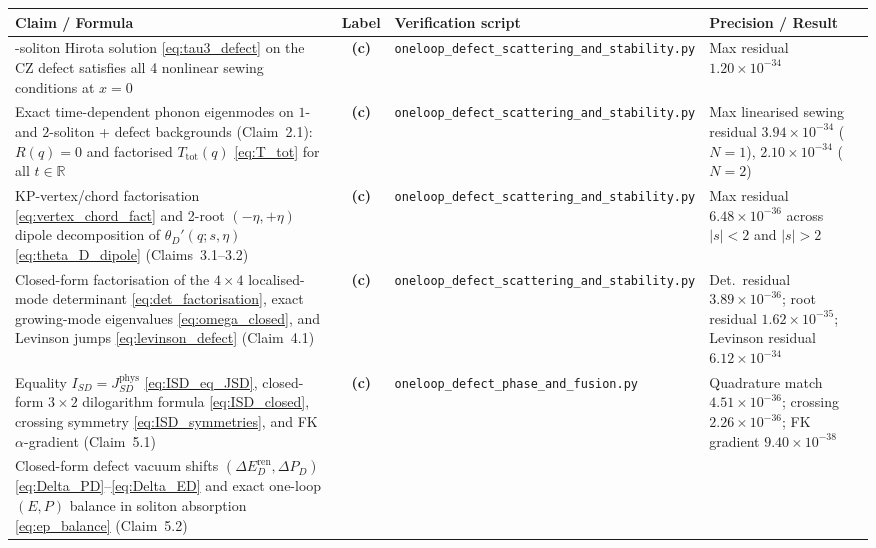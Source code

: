 \documentclass[11pt,a4paper]{article}
\begin{document}
\begin{table}[htbp]
\centering
\footnotesize
\begin{tabular}{>{\raggedright\arraybackslash}p{4.3cm} c >{\raggedright\arraybackslash}p{5.6cm} >{\raggedright\arraybackslash}p{3.8cm}}
\toprule
\textbf{Claim / Formula} & \textbf{Label} & \textbf{Verification script} & \textbf{Precision / Result} \\
\midrule
3-soliton Hirota solution \eqref{eq:tau3_defect} on the CZ defect satisfies all 4 nonlinear sewing conditions at $x=0$ &
\textbf{(c)} & \texttt{oneloop\_defect\_scattering\_and\_stability.py} &
Max residual $1.20\times 10^{-34}$ \\
\addlinespace
Exact time-dependent phonon eigenmodes on $1$- and $2$-soliton + defect backgrounds (Claim~2.1): $R(q)=0$ and factorised $T_{\mathrm{tot}}(q)$ \eqref{eq:T_tot} for all $t \in \mathbb{R}$ &
\textbf{(c)} & \texttt{oneloop\_defect\_scattering\_and\_stability.py} &
Max linearised sewing residual $3.94\times 10^{-34}$ ($N=1$), $2.10\times 10^{-34}$ ($N=2$) \\
\addlinespace
KP-vertex/chord factorisation \eqref{eq:vertex_chord_fact} and 2-root $(-\eta,+\eta)$ dipole decomposition of $\theta_D'(q;s,\eta)$ \eqref{eq:theta_D_dipole} (Claims~3.1--3.2) &
\textbf{(c)} & \texttt{oneloop\_defect\_scattering\_and\_stability.py} &
Max residual $6.48\times 10^{-36}$ across $|s|<2$ and $|s|>2$ \\
\addlinespace
Closed-form factorisation of the $4\times 4$ localised-mode determinant \eqref{eq:det_factorisation}, exact growing-mode eigenvalues \eqref{eq:omega_closed}, and Levinson jumps \eqref{eq:levinson_defect} (Claim~4.1) &
\textbf{(c)} & \texttt{oneloop\_defect\_scattering\_and\_stability.py} &
Det.\ residual $3.89\times 10^{-36}$; root residual $1.62\times 10^{-35}$; Levinson residual $6.12\times 10^{-34}$ \\
\addlinespace
Equality $I_{SD}=J_{SD}^{\mathrm{phys}}$ \eqref{eq:ISD_eq_JSD}, closed-form $3\times 2$ dilogarithm formula \eqref{eq:ISD_closed}, crossing symmetry \eqref{eq:ISD_symmetries}, and FK $\alpha$-gradient (Claim~5.1) &
\textbf{(c)} & \texttt{oneloop\_defect\_phase\_and\_fusion.py} &
Quadrature match $4.51\times 10^{-36}$; crossing $2.26\times 10^{-36}$; FK gradient $9.40\times 10^{-38}$ \\
\addlinespace
Closed-form defect vacuum shifts $(\Delta E_D^{\mathrm{ren}},\Delta P_D)$ \eqref{eq:Delta_PD}--\eqref{eq:Delta_ED} and exact one-loop $(E,P)$ balance in soliton absorption \eqref{eq:ep_balance} (Claim~5.2) &

\end{tabular}
\end{table}
\end{document}
